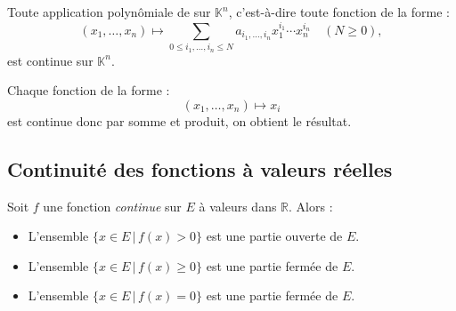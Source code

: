 \documentclass[a4paper,10pt]{report}
\begin{document}
\begin{prop} Toute application polynômiale de sur $\mathbb{K}^n$, c'est-à-dire toute fonction de la forme :
$$ (x_1, \ldots, x_n) \mapsto \sum_{0 \leq i_1, \ldots, i_n \leq N} a_{i_1, \ldots, i_n} x_1^{i_1} \cdots x_n^{i_n} \quad (N \geq 0),$$
est continue sur $\mathbb{K}^n$.
\end{prop}

\begin{preuve} Chaque fonction de la forme :
$$  (x_1, \ldots, x_n) \mapsto x_i$$
est continue donc par somme et produit, on obtient le résultat.
\end{preuve}



\subsection{Continuité des fonctions à valeurs réelles}

\begin{prop} Soit $f$ une fonction \textit{continue} sur $E$ à valeurs dans $\mathbb{R}$. Alors :

\begin{itemize}
\item L'ensemble $\lbrace x \in E \, \vert \, f(x)>0 \rbrace$ est une partie ouverte de $E$.
\item L'ensemble $\lbrace x \in E \, \vert \, f(x)\geq 0 \rbrace$ est une partie fermée de $E$.
\item L'ensemble $\lbrace x \in E \, \vert \, f(x) = 0 \rbrace$ est une partie fermée de $E$.
\end{itemize}
\end{prop}

\begin{preuve} 

\end{preuve}
\end{document}
